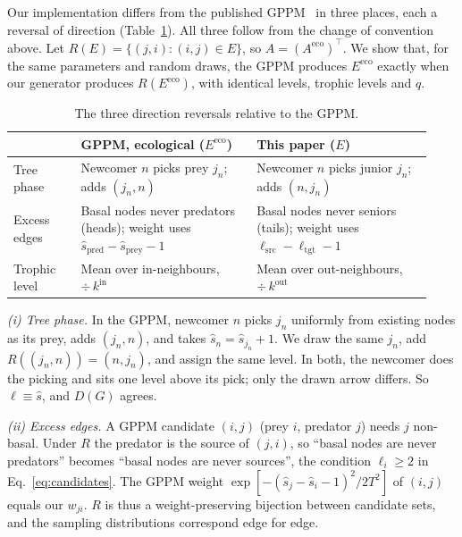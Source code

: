 Our implementation differs from the published GPPM~\cite{klaise2016neurons}
in three places, each a reversal of direction (Table~\ref{tab:reversals}).
All three follow from the change of convention above. Let
$R(E)=\{(j,i):(i,j)\in E\}$, so $A=(A^{\mathrm{eco}})^{\top}$. We show that,
for the same parameters and random draws, the GPPM produces
$E^{\mathrm{eco}}$ exactly when our generator produces $R(E^{\mathrm{eco}})$,
with identical levels, trophic levels and $q$.

\begin{table}[h]
\centering
\small
\begin{tabular}{@{}p{0.15\linewidth}p{0.39\linewidth}p{0.39\linewidth}@{}}
\toprule
 & GPPM, ecological ($E^{\mathrm{eco}}$) & This paper ($E$) \\
\midrule
Tree phase & Newcomer $n$ picks prey $j_n$; adds $(j_n,n)$
           & Newcomer $n$ picks junior $j_n$; adds $(n,j_n)$ \\[2pt]
Excess edges & Basal nodes never predators (heads); weight uses
               $\hat s_{\mathrm{pred}}-\hat s_{\mathrm{prey}}-1$
             & Basal nodes never seniors (tails); weight uses
               $\ell_{\mathrm{src}}-\ell_{\mathrm{tgt}}-1$ \\[2pt]
Trophic level & Mean over in-neighbours, $\div\,k^{\mathrm{in}}$
              & Mean over out-neighbours, $\div\,k^{\mathrm{out}}$ \\
\bottomrule
\end{tabular}
\caption{The three direction reversals relative to the GPPM.}
\label{tab:reversals}
\end{table}

\emph{(i) Tree phase.} In the GPPM, newcomer $n$ picks $j_n$ uniformly from
existing nodes as its prey, adds $(j_n,n)$, and takes $\hat s_n=\hat
s_{j_n}+1$. We draw the same $j_n$, add $R((j_n,n))=(n,j_n)$, and assign the
same level. In both, the newcomer does the picking and sits one level above
its pick; only the drawn arrow differs. So $\ell\equiv\hat s$, and $D(G)$
agrees.

\emph{(ii) Excess edges.} A GPPM candidate $(i,j)$ (prey $i$, predator $j$)
needs $j$ non-basal. Under $R$ the predator is the source of $(j,i)$, so
``basal nodes are never predators'' becomes ``basal nodes are never sources'',
the condition $\ell_i\ge2$ in Eq.~\eqref{eq:candidates}. The GPPM weight
$\exp[-(\hat s_j-\hat s_i-1)^2/2T^2]$ of $(i,j)$ equals our $w_{ji}$. $R$ is
thus a weight-preserving bijection between candidate sets, and the sampling
distributions correspond edge for edge.


